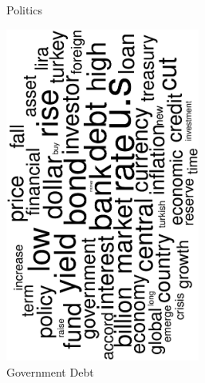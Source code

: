\begin{figure}
\begin{subfigure}{0.32\textwidth}
		\caption{Politics}
	\end{subfigure}
	\begin{subfigure}{0.32\textwidth}
		\includegraphics[width=0.7\textwidth,angle=270]{figures/wordcloud12.eps}
		\caption{Government Debt}
	\end{subfigure}
	\begin{subfigure}{0.32\textwidth}

\end{subfigure}
\end{figure}
